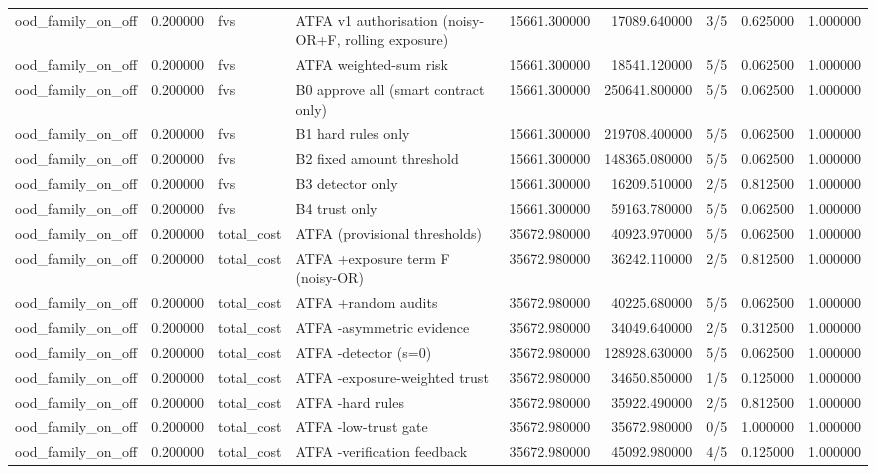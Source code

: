 \begin{tabular}{lrllrrlrr}
ood\_family\_on\_off & 0.200000 & fvs & ATFA v1 authorisation (noisy-OR+F, rolling exposure) & 15661.300000 & 17089.640000 & 3/5 & 0.625000 & 1.000000 \\
ood\_family\_on\_off & 0.200000 & fvs & ATFA weighted-sum risk & 15661.300000 & 18541.120000 & 5/5 & 0.062500 & 1.000000 \\
ood\_family\_on\_off & 0.200000 & fvs & B0 approve all (smart contract only) & 15661.300000 & 250641.800000 & 5/5 & 0.062500 & 1.000000 \\
ood\_family\_on\_off & 0.200000 & fvs & B1 hard rules only & 15661.300000 & 219708.400000 & 5/5 & 0.062500 & 1.000000 \\
ood\_family\_on\_off & 0.200000 & fvs & B2 fixed amount threshold & 15661.300000 & 148365.080000 & 5/5 & 0.062500 & 1.000000 \\
ood\_family\_on\_off & 0.200000 & fvs & B3 detector only & 15661.300000 & 16209.510000 & 2/5 & 0.812500 & 1.000000 \\
ood\_family\_on\_off & 0.200000 & fvs & B4 trust only & 15661.300000 & 59163.780000 & 5/5 & 0.062500 & 1.000000 \\
ood\_family\_on\_off & 0.200000 & total\_cost & ATFA (provisional thresholds) & 35672.980000 & 40923.970000 & 5/5 & 0.062500 & 1.000000 \\
ood\_family\_on\_off & 0.200000 & total\_cost & ATFA +exposure term F (noisy-OR) & 35672.980000 & 36242.110000 & 2/5 & 0.812500 & 1.000000 \\
ood\_family\_on\_off & 0.200000 & total\_cost & ATFA +random audits & 35672.980000 & 40225.680000 & 5/5 & 0.062500 & 1.000000 \\
ood\_family\_on\_off & 0.200000 & total\_cost & ATFA -asymmetric evidence & 35672.980000 & 34049.640000 & 2/5 & 0.312500 & 1.000000 \\
ood\_family\_on\_off & 0.200000 & total\_cost & ATFA -detector (s=0) & 35672.980000 & 128928.630000 & 5/5 & 0.062500 & 1.000000 \\
ood\_family\_on\_off & 0.200000 & total\_cost & ATFA -exposure-weighted trust & 35672.980000 & 34650.850000 & 1/5 & 0.125000 & 1.000000 \\
ood\_family\_on\_off & 0.200000 & total\_cost & ATFA -hard rules & 35672.980000 & 35922.490000 & 2/5 & 0.812500 & 1.000000 \\
ood\_family\_on\_off & 0.200000 & total\_cost & ATFA -low-trust gate & 35672.980000 & 35672.980000 & 0/5 & 1.000000 & 1.000000 \\
ood\_family\_on\_off & 0.200000 & total\_cost & ATFA -verification feedback & 35672.980000 & 45092.980000 & 4/5 & 0.125000 & 1.000000 \\

\end{tabular}
